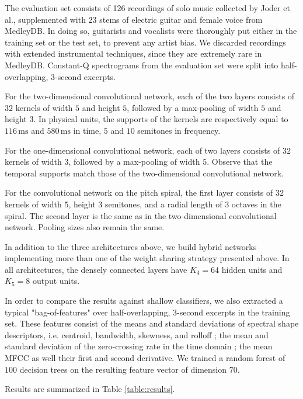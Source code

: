 \documentclass{article}
\makeatletter
\newcommand*{\ie}{i.e.\@\xspace}
\newcommand*{\etal}{et al.\@\xspace}
\makeatother
\begin{document}
The evaluation set consists of 126 recordings of solo music collected by
Joder \etal \cite{Joder2009}, supplemented with
23 stems of electric guitar and female voice from MedleyDB.
In doing so, guitarists and vocalists were thoroughly put either in the training set or the test set,
to prevent any artist bias.
We discarded recordings with extended instrumental techniques, since they are
extremely rare in MedleyDB.
Constant-Q spectrograms from the evaluation set were split into half-overlapping,
3-second excerpts.

For the two-dimensional convolutional network, each of the two layers consists of
$32$ kernels of width $5$ and height $5$, followed by a max-pooling of width $5$
and height $3$. In physical units, the supports of the kernels are respectively equal to
$116\,\mathrm{ms}$ and $580\,\mathrm{ms}$ in time, $5$ and $10$ semitones in frequency.

For the one-dimensional convolutional network, each of two layers consists of
$32$ kernels of width $3$, followed by a max-pooling of width $5$. Observe that the temporal
supports match those of the two-dimensional convolutional network.

For the convolutional network on the pitch spiral, the first layer consists of $32$ kernels
of width $5$, height $3$ semitones, and a radial length of $3$ octaves in the spiral.
The second layer is the same as in the two-dimensional convolutional network. Pooling sizes
also remain the same.

In addition to the three architectures above, we build hybrid networks implementing
more than one of the weight sharing strategy presented above.
In all architectures, the densely connected layers have $K_4=64$ hidden units
and $K_5=8$ output units.


In order to compare the results against shallow classifiers, we also extracted a typical
"bag-of-features" over half-overlapping, 3-second excerpts in the training set.
These features consist of the means and standard
deviations of spectral shape descriptors, \ie centroid, bandwidth, skewness,
and rolloff ; the mean and standard deviation of the zero-crossing rate in the time domain ;
the mean MFCC as well their first and second derivative.
We trained a random forest of $100$ decision trees on the resulting feature vector
of dimension $70$.

Results are summarized in Table \ref{table:results}.
\end{document}
